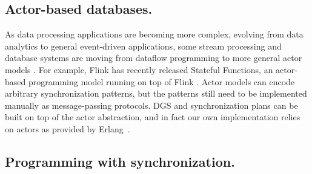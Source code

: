 \subsection{Actor-based databases.}
As data processing applications are becoming more complex, evolving from
data analytics to general event-driven applications, some stream
processing and database systems are moving from dataflow programming to more
general actor models
\cite{DBLP:conf/sigmod/CarboneFKK20,DBLP:conf/cidr/Bernstein19,DBLP:conf/cidr/BernsteinDKM17,DBLP:conf/sigmod/0001S18,xu2021move}.
For example, Flink has recently released Stateful Functions,
an actor-based programming model running on top of Flink
\cite{DBLP:journals/pvldb/AkhterFK19,StatefulFunctions}.
Actor models can encode arbitrary synchronization patterns,
but the patterns still need to be implemented manually as
message-passing protocols.
DGS and synchronization plans can be built on top
of the actor abstraction, and in fact our own implementation
relies on actors as provided by Erlang~\cite{armstrong1993erlang}.

\subsection{Programming with synchronization.}

